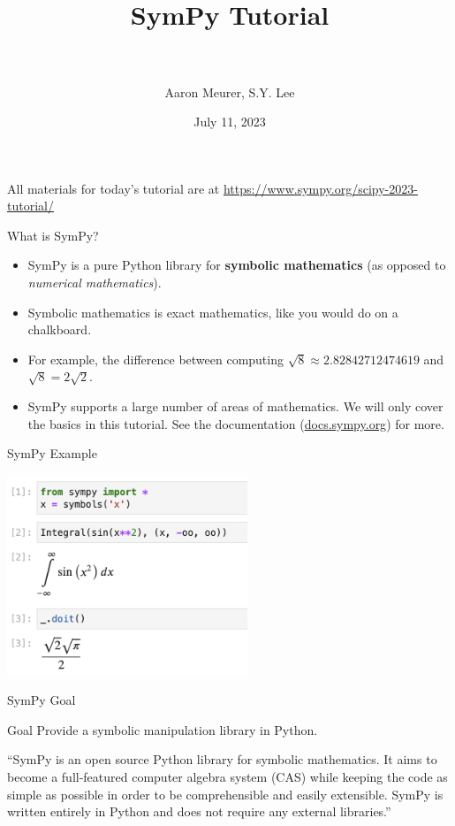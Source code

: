 \documentclass[xcolor=svgnames]{beamer}
\title[SymPy\hspace{4em}\insertframenumber/
\inserttotalframenumber]{~\\ SymPy Tutorial \\~}
\author[A. Meurer, S.Y. Lee]
{Aaron Meurer, S.Y. Lee}
\institute{\pgfuseimage{mylogo}}
\date{July 11, 2023}
\begin{document}
\begin{frame}
  \maketitle
\begin{center}
\normalsize All materials for today's tutorial are at \url{https://www.sympy.org/scipy-2023-tutorial/}
\end{center}
\end{frame}

\begin{frame}
  \begin{block}{What is SymPy?}
\begin{itemize}
    \item SymPy is a pure Python library for \textbf{symbolic mathematics} (as
      opposed to \textit{numerical mathematics}).
\item Symbolic mathematics is exact mathematics, like you would do on a chalkboard.
      \item For example, the difference between computing $\sqrt{8}\approx
        2.82842712474619$ and $\sqrt{8}=2\sqrt{2}$.
\item SymPy supports a large number of areas of mathematics. We will only
  cover the basics in this tutorial. See the documentation (\href{https://docs.sympy.org/latest/index.html}{docs.sympy.org})
  for more.
\end{itemize}
    \end{block}
\end{frame}

\begin{frame}{SymPy Example}
  \begin{block}{}
    \includegraphics[height=6cm]{example.png}
  \end{block}
\end{frame}

\begin{frame}{SymPy Goal}
  \begin{block}{Goal}
    Provide a symbolic manipulation library in Python.
  \end{block}
  \begin{block}

    ``SymPy is an open source Python library for symbolic mathematics. It aims to
    become a full-featured computer algebra system (CAS) while keeping the code as
    simple as possible in order to be comprehensible and easily extensible. SymPy
    is written entirely in Python and does not require any external libraries.''

  \end{block}
\end{frame}
\end{document}

